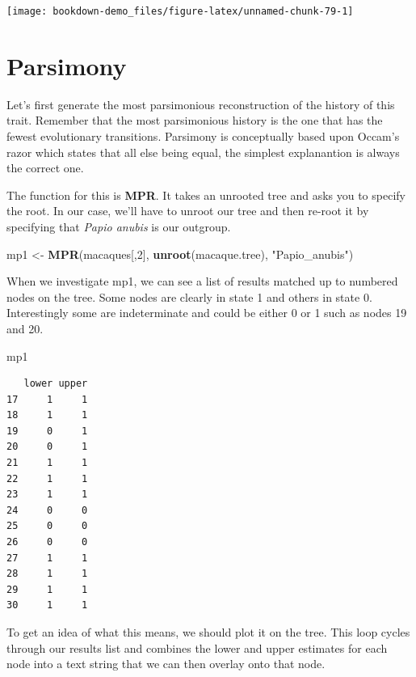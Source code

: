 \documentclass[
]{book}
\newenvironment{Shaded}{\begin{snugshade}}{\end{snugshade}}
\newcommand{\DecValTok}[1]{\textcolor[rgb]{0.00,0.00,0.81}{#1}}
\newcommand{\KeywordTok}[1]{\textcolor[rgb]{0.13,0.29,0.53}{\textbf{#1}}}
\newcommand{\NormalTok}[1]{#1}
\newcommand{\StringTok}[1]{\textcolor[rgb]{0.31,0.60,0.02}{#1}}
\begin{document}
\begin{center}\texttt{[image: bookdown-demo\_files/figure-latex/unnamed-chunk-79-1]} \end{center}

\hypertarget{parsimony}{%
\section{Parsimony}\label{parsimony}}

Let's first generate the most parsimonious reconstruction of the history of this trait. Remember that the most parsimonious history is the one that has the fewest evolutionary transitions. Parsimony is conceptually based upon Occam's razor which states that all else being equal, the simplest explanantion is always the correct one.

The function for this is \textbf{MPR}. It takes an unrooted tree and asks you to specify the root. In our case, we'll have to unroot our tree and then re-root it by specifying that \emph{Papio anubis} is our outgroup.

\begin{Shaded}
\begin{Highlighting}[]
\NormalTok{mp1 \textless{}{-}}\StringTok{ }\KeywordTok{MPR}\NormalTok{(macaques[,}\DecValTok{2}\NormalTok{], }\KeywordTok{unroot}\NormalTok{(macaque.tree), }\StringTok{"Papio\_anubis"}\NormalTok{)}
\end{Highlighting}
\end{Shaded}

When we investigate mp1, we can see a list of results matched up to numbered nodes on the tree. Some nodes are clearly in state 1 and others in state 0. Interestingly some are indeterminate and could be either 0 or 1 such as nodes 19 and 20.

\begin{Shaded}
\begin{Highlighting}[]
\NormalTok{mp1}
\end{Highlighting}
\end{Shaded}

\begin{verbatim}
   lower upper
17     1     1
18     1     1
19     0     1
20     0     1
21     1     1
22     1     1
23     1     1
24     0     0
25     0     0
26     0     0
27     1     1
28     1     1
29     1     1
30     1     1
\end{verbatim}

To get an idea of what this means, we should plot it on the tree. This loop cycles through our results list and combines the lower and upper estimates for each node into a text string that we can then overlay onto that node.
\end{document}
